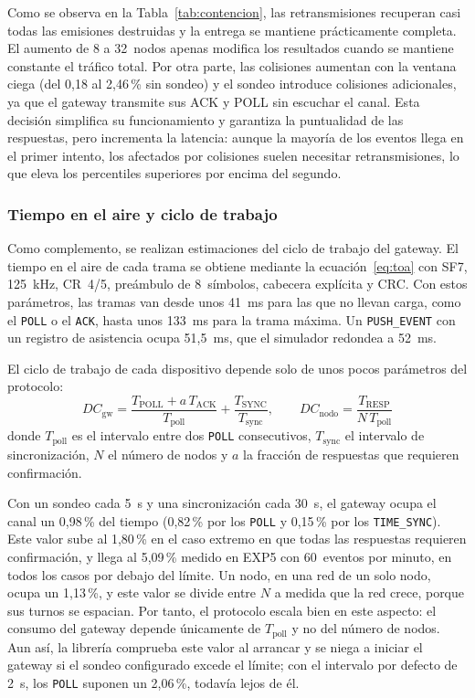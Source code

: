Como se observa en la Tabla~\ref{tab:contencion}, las retransmisiones recuperan casi todas las emisiones destruidas y la entrega se mantiene prácticamente completa. El aumento de 8 a 32~nodos apenas modifica los resultados cuando se mantiene constante el tráfico total. Por otra parte, las colisiones aumentan con la ventana ciega (del 0,18 al 2,46\,\% sin sondeo) y el sondeo introduce colisiones adicionales, ya que el gateway transmite sus ACK y POLL sin escuchar el canal. Esta decisión simplifica su funcionamiento y garantiza la puntualidad de las respuestas, pero incrementa la latencia: aunque la mayoría de los eventos llega en el primer intento, los afectados por colisiones suelen necesitar retransmisiones, lo que eleva los percentiles superiores por encima del segundo.



\subsubsection{Tiempo en el aire y ciclo de trabajo}\label{sec:dutycycle}

Como complemento, se realizan estimaciones del ciclo de trabajo del gateway. El tiempo en el aire de cada trama se obtiene mediante la ecuación~\ref{eq:toa} con SF7, 125~kHz, CR~4/5, preámbulo de 8~símbolos, cabecera explícita y CRC. Con estos parámetros, las tramas van desde unos 41~ms para las que no llevan carga, como el \texttt{POLL} o el \texttt{ACK}, hasta unos 133~ms para la trama máxima. Un \texttt{PUSH\_EVENT} con un registro de asistencia ocupa 51,5~ms, que el simulador redondea a 52~ms.

El ciclo de trabajo de cada dispositivo depende solo de unos pocos parámetros del protocolo:
\begin{equation}
\label{eq:duty}
DC_{\text{gw}} = \frac{T_{\text{POLL}} + a\,T_{\text{ACK}}}{T_{\text{poll}}} + \frac{T_{\text{SYNC}}}{T_{\text{sync}}},
\qquad
DC_{\text{nodo}} = \frac{T_{\text{RESP}}}{N\,T_{\text{poll}}}
\end{equation}
donde $T_{\text{poll}}$ es el intervalo entre dos \texttt{POLL} consecutivos, $T_{\text{sync}}$ el intervalo de sincronización, $N$ el número de nodos y $a$ la fracción de respuestas que requieren confirmación.

Con un sondeo cada 5~s y una sincronización cada 30~s, el gateway ocupa el canal un 0,98\,\% del tiempo (0,82\,\% por los \texttt{POLL} y 0,15\,\% por los \texttt{TIME\_SYNC}). Este valor sube al 1,80\,\% en el caso extremo en que todas las respuestas requieren confirmación, y llega al 5,09\,\% medido en EXP5 con 60~eventos por minuto, en todos los casos por debajo del límite. Un nodo, en una red de un solo nodo, ocupa un 1,13\,\%, y este valor se divide entre $N$ a medida que la red crece, porque sus turnos se espacian. Por tanto, el protocolo escala bien en este aspecto: el consumo del gateway depende únicamente de $T_{\text{poll}}$ y no del número de nodos. Aun así, la librería comprueba este valor al arrancar y se niega a iniciar el gateway si el sondeo configurado excede el límite; con el intervalo por defecto de 2~s, los \texttt{POLL} suponen un 2,06\,\%, todavía lejos de él.

